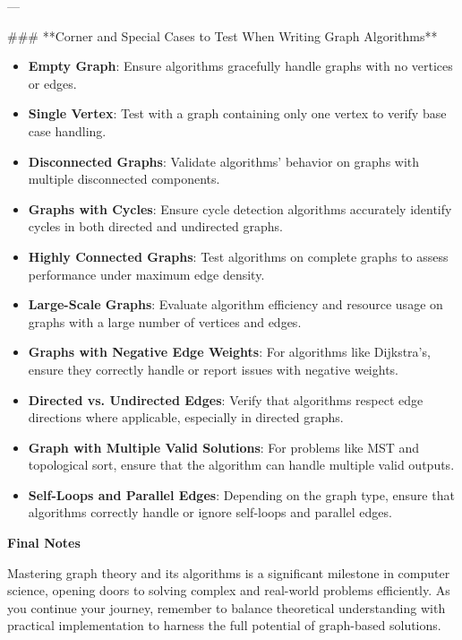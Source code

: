 ---
    
### **Corner and Special Cases to Test When Writing Graph Algorithms**

\begin{itemize}
    \item \textbf{Empty Graph}: Ensure algorithms gracefully handle graphs with no vertices or edges.
    \item \textbf{Single Vertex}: Test with a graph containing only one vertex to verify base case handling.
    \item \textbf{Disconnected Graphs}: Validate algorithms' behavior on graphs with multiple disconnected components.
    \item \textbf{Graphs with Cycles}: Ensure cycle detection algorithms accurately identify cycles in both directed and undirected graphs.
    \item \textbf{Highly Connected Graphs}: Test algorithms on complete graphs to assess performance under maximum edge density.
    \item \textbf{Large-Scale Graphs}: Evaluate algorithm efficiency and resource usage on graphs with a large number of vertices and edges.
    \item \textbf{Graphs with Negative Edge Weights}: For algorithms like Dijkstra's, ensure they correctly handle or report issues with negative weights.
    \item \textbf{Directed vs. Undirected Edges}: Verify that algorithms respect edge directions where applicable, especially in directed graphs.
    \item \textbf{Graph with Multiple Valid Solutions}: For problems like MST and topological sort, ensure that the algorithm can handle multiple valid outputs.
    \item \textbf{Self-Loops and Parallel Edges}: Depending on the graph type, ensure that algorithms correctly handle or ignore self-loops and parallel edges.
\end{itemize}

\textbf{Final Notes}

Mastering graph theory and its algorithms is a significant milestone in computer science, opening doors to solving complex and real-world problems efficiently. As you continue your journey, remember to balance theoretical understanding with practical implementation to harness the full potential of graph-based solutions.


